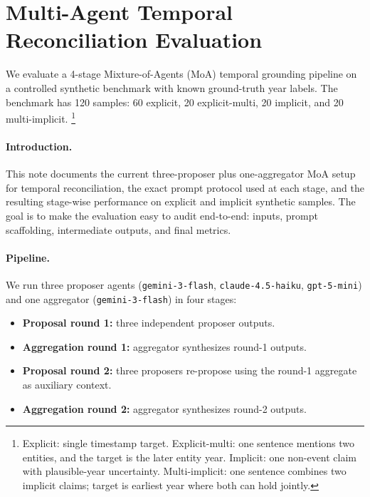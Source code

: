 \section{Multi-Agent Temporal Reconciliation Evaluation}
\label{sec:three-agent-note}

We evaluate a 4-stage Mixture-of-Agents (MoA) temporal grounding pipeline on a controlled synthetic benchmark with known ground-truth year labels.
The benchmark has 120 samples: 60 explicit, 20 explicit-multi, 20 implicit, and 20 multi-implicit.
\footnote{Explicit: single timestamp target. Explicit-multi: one sentence mentions two entities, and the target is the later entity year. Implicit: one non-event claim with plausible-year uncertainty. Multi-implicit: one sentence combines two implicit claims; target is earliest year where both can hold jointly.}

\paragraph{Introduction.}
This note documents the current three-proposer plus one-aggregator MoA setup for temporal reconciliation, the exact prompt protocol used at each stage, and the resulting stage-wise performance on explicit and implicit synthetic samples. The goal is to make the evaluation easy to audit end-to-end: inputs, prompt scaffolding, intermediate outputs, and final metrics.

\paragraph{Pipeline.}
We run three proposer agents (\texttt{gemini-3-flash}, \texttt{claude-4.5-haiku}, \texttt{gpt-5-mini}) and one aggregator (\texttt{gemini-3-flash}) in four stages:
\begin{itemize}
  \item \textbf{Proposal round 1:} three independent proposer outputs.
  \item \textbf{Aggregation round 1:} aggregator synthesizes round-1 outputs.
  \item \textbf{Proposal round 2:} three proposers re-propose using the round-1 aggregate as auxiliary context.
  \item \textbf{Aggregation round 2:} aggregator synthesizes round-2 outputs.
\end{itemize}

